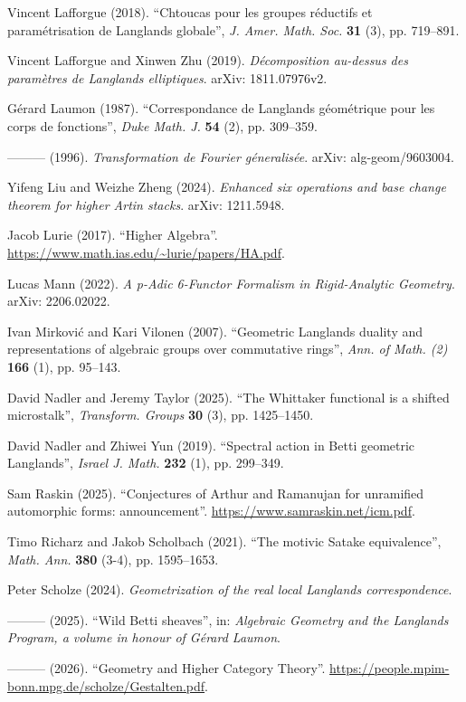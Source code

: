 \begin{list}{}{\setlength{\leftmargin}{2em}\setlength{\itemindent}{-2em}\setlength{\labelwidth}{0pt}\setlength{\labelsep}{0pt}\setlength{\itemsep}{0.3em}\setlength{\parsep}{0pt}\setlength{\topsep}{0.4em}}
\item Vincent Lafforgue (2018). “Chtoucas pour les groupes réductifs et paramétrisation de Langlands globale”, \textit{J. Amer. Math. Soc.} \textbf{31} (3), pp. 719–891.
\item Vincent Lafforgue and Xinwen Zhu (2019). \textit{Décomposition au-dessus des paramètres de Langlands elliptiques}. arXiv: 1811.07976v2.
\item Gérard Laumon (1987). “Correspondance de Langlands géométrique pour les corps de fonctions”, \textit{Duke Math. J.} \textbf{54} (2), pp. 309–359.
\item ——— (1996). \textit{Transformation de Fourier géneralisée}. arXiv: alg-geom/9603004.
\item Yifeng Liu and Weizhe Zheng (2024). \textit{Enhanced six operations and base change theorem for higher Artin stacks}. arXiv: 1211.5948.
\item Jacob Lurie (2017). “Higher Algebra”. \url{https://www.math.ias.edu/~lurie/papers/HA.pdf}.
\item Lucas Mann (2022). \textit{A p-Adic 6-Functor Formalism in Rigid-Analytic Geometry}. arXiv: 2206.02022.
\item Ivan Mirković and Kari Vilonen (2007). “Geometric Langlands duality and representations of algebraic groups over commutative rings”, \textit{Ann. of Math. (2)} \textbf{166} (1), pp. 95–143.
\item David Nadler and Jeremy Taylor (2025). “The Whittaker functional is a shifted microstalk”, \textit{Transform. Groups} \textbf{30} (3), pp. 1425–1450.
\item David Nadler and Zhiwei Yun (2019). “Spectral action in Betti geometric Langlands”, \textit{Israel J. Math.} \textbf{232} (1), pp. 299–349.
\item Sam Raskin (2025). “Conjectures of Arthur and Ramanujan for unramified automorphic forms: announcement”. \url{https://www.samraskin.net/icm.pdf}.
\item Timo Richarz and Jakob Scholbach (2021). “The motivic Satake equivalence”, \textit{Math. Ann.} \textbf{380} (3-4), pp. 1595–1653.
\item Peter Scholze (2024). \textit{Geometrization of the real local Langlands correspondence}.
\item ——— (2025). “Wild Betti sheaves”, in: \textit{Algebraic Geometry and the Langlands Program, a volume in honour of Gérard Laumon}.
\item ——— (2026). “Geometry and Higher Category Theory”. \url{https://people.mpim-bonn.mpg.de/scholze/Gestalten.pdf}.

\end{list}
